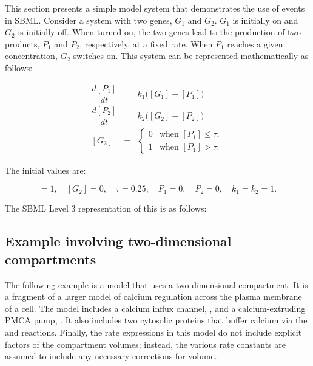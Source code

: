 This section presents a simple model system that demonstrates the
use of events in SBML.  Consider a system with two genes,
$G_1$ and $G_2$.  $G_1$ is initially
on and $G_2$ is initially off.  When turned on, the two
genes lead to the production of two products, $P_1$ and $P_2$,
respectively, at a fixed rate.  When $P_1$ reaches a given
concentration, $G_2$ switches on.  This system can be
represented mathematically as follows:
\begin{linenomath}
\begin{eqnarray*}
  \dfrac{d [P_1]}{d t} & = & k_1 \big([G_1] - [P_1]\big)\\[3pt]
  \dfrac{d [P_2]}{d t} & = & k_2 \big([G_2] - [P_2]\big)\\[0pt]
  [G_2] & = &
    \begin{cases}
      0 & \text{when $[P_1] \leq \tau$},\\
      1 & \text{when $[P_1] > \tau$}.
    \end{cases}
\end{eqnarray*}
\end{linenomath}

The initial values are:
\begin{linenomath}
\begin{equation*}
  [G_1] = 1, \quad [G_2] = 0, \quad \tau = 0.25, \quad P_1 = 0, \quad P_2 = 0, \quad k_1 = k_2 = 1.
\end{equation*}
\end{linenomath}

The SBML Level 3 representation of this is as follows:



\subsection{Example involving two-dimensional compartments}
\label{sec:two-dimensional-eg}

The following example is a model that uses a two-dimensional
compartment.  It is a fragment of a larger model of calcium
regulation across the plasma membrane of a cell.  The model
includes a calcium influx channel, , and a
calcium-extruding PMCA pump, .  It also includes two
cytosolic proteins that buffer calcium via the
 and
 reactions.  Finally, the
rate expressions in this model do not include explicit factors of
the compartment volumes; instead, the various rate constants are
assumed to include any necessary corrections for volume.

